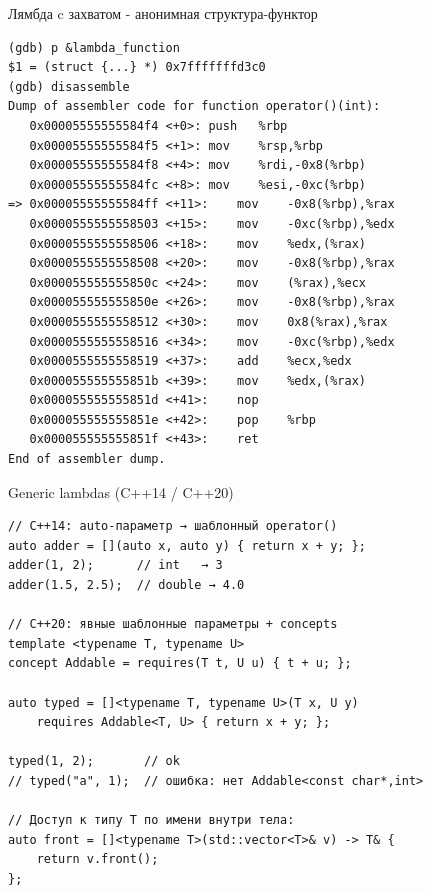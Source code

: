 \documentclass{beamer}
\begin{document}
\begin{frame}[fragile]{Лямбда c захватом - анонимная структура-функтор}
\begin{lstlisting}
(gdb) p &lambda_function
$1 = (struct {...} *) 0x7fffffffd3c0
(gdb) disassemble
Dump of assembler code for function operator()(int):
   0x00005555555584f4 <+0>:	push   %rbp
   0x00005555555584f5 <+1>:	mov    %rsp,%rbp
   0x00005555555584f8 <+4>:	mov    %rdi,-0x8(%rbp)
   0x00005555555584fc <+8>:	mov    %esi,-0xc(%rbp)
=> 0x00005555555584ff <+11>:	mov    -0x8(%rbp),%rax
   0x0000555555558503 <+15>:	mov    -0xc(%rbp),%edx
   0x0000555555558506 <+18>:	mov    %edx,(%rax)
   0x0000555555558508 <+20>:	mov    -0x8(%rbp),%rax
   0x000055555555850c <+24>:	mov    (%rax),%ecx
   0x000055555555850e <+26>:	mov    -0x8(%rbp),%rax
   0x0000555555558512 <+30>:	mov    0x8(%rax),%rax
   0x0000555555558516 <+34>:	mov    -0xc(%rbp),%edx
   0x0000555555558519 <+37>:	add    %ecx,%edx
   0x000055555555851b <+39>:	mov    %edx,(%rax)
   0x000055555555851d <+41>:	nop
   0x000055555555851e <+42>:	pop    %rbp
   0x000055555555851f <+43>:	ret
End of assembler dump.
\end{lstlisting}
\end{frame}

\begin{frame}[fragile]{Generic lambdas (C++14 / C++20)}
\begin{lstlisting}
// C++14: auto-параметр → шаблонный operator()
auto adder = [](auto x, auto y) { return x + y; };
adder(1, 2);      // int   → 3
adder(1.5, 2.5);  // double → 4.0

// C++20: явные шаблонные параметры + concepts
template <typename T, typename U>
concept Addable = requires(T t, U u) { t + u; };

auto typed = []<typename T, typename U>(T x, U y)
    requires Addable<T, U> { return x + y; };

typed(1, 2);       // ok
// typed("a", 1);  // ошибка: нет Addable<const char*,int>

// Доступ к типу T по имени внутри тела:
auto front = []<typename T>(std::vector<T>& v) -> T& {
    return v.front();
};
\end{lstlisting}
\end{frame}
\end{document}
